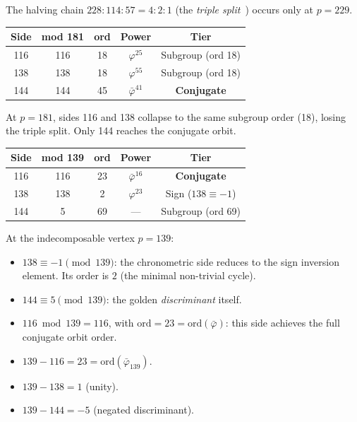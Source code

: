 \documentclass[12pt,oneside]{article}
\theoremstyle{principia}
\theoremstyle{definition}
\theoremstyle{remark}
\begin{document}
The halving chain $228 : 114 : 57 = 4 : 2 : 1$ (the
\emph{triple split}~\cite{dwm_fst})
occurs only at $p = 229$.

\begin{center}
\begin{tabular}{@{}ccccc@{}}
\toprule
Side & mod 181 & ord & Power & Tier \\
\midrule
116 & 116 & 18 & $\varphi^{25}$ & Subgroup (ord 18) \\
138 & 138 & 18 & $\varphi^{55}$ & Subgroup (ord 18) \\
144 & 144 & 45 & $\bar\varphi^{41}$ & \textbf{Conjugate} \\
\bottomrule
\end{tabular}
\end{center}

At $p = 181$, sides 116 and 138 collapse to the same subgroup order (18),
losing the triple split. Only 144 reaches the conjugate orbit.

\begin{center}
\begin{tabular}{@{}ccccc@{}}
\toprule
Side & mod 139 & ord & Power & Tier \\
\midrule
116 & 116 & 23 & $\bar\varphi^{16}$ & \textbf{Conjugate} \\
138 & 138 &  2 & $\varphi^{23}$ & Sign ($138 \equiv -1$) \\
144 &   5 & 69 & --- & Subgroup (ord 69) \\
\bottomrule
\end{tabular}
\end{center}

At the indecomposable vertex $p = 139$:
\begin{itemize}
  \item $138 \equiv -1 \pmod{139}$: the chronometric side reduces to
    the sign inversion element. Its order is $2$ (the minimal non-trivial cycle).
  \item $144 \equiv 5 \pmod{139}$: the golden \emph{discriminant} itself.
  \item $116 \bmod 139 = 116$, with $\mathrm{ord} = 23 = \mathrm{ord}(\bar\varphi)$:
    this side achieves the full conjugate orbit order.
  \item $139 - 116 = 23 = \mathrm{ord}(\bar\varphi_{139})$.
  \item $139 - 138 = 1$ (unity).
  \item $139 - 144 = -5$ (negated discriminant).
\end{itemize}
\end{document}
